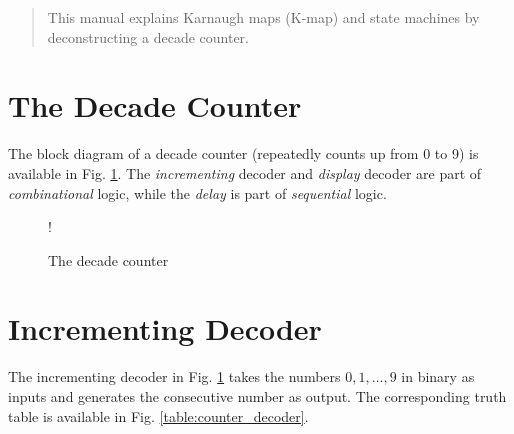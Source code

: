 \documentclass[journal,12pt,twocolumn]{IEEEtran}
\begin{document}
% 







\maketitle

\tableofcontents

\bigskip

\renewcommand{\thefigure}{\theenumi}
\renewcommand{\thetable}{\theenumi}

\begin{abstract}
This manual explains Karnaugh maps (K-map) and state machines by deconstructing a decade counter.
\end{abstract}


\section{The Decade Counter}
The block diagram of a decade counter (repeatedly counts up from 0 to 9)
is available in Fig. \ref{fig:dec_counter}.  The {\em incrementing } decoder
and {\em display} decoder are part of {\em combinational} logic, while
the {\em delay} is part of {\em sequential} logic.
\begin{figure}[!h]
\resizebox {\columnwidth} {!} {

}
\caption{The decade counter}
\label{fig:dec_counter}
\end{figure}
%
\section{Incrementing Decoder}
The incrementing decoder in Fig. \ref{fig:dec_counter}  takes the numbers $0,1,\dots,9$ in binary as inputs and generates
the consecutive number as output.  The corresponding truth table is available in Fig. \ref{table:counter_decoder}.

\end{document}
